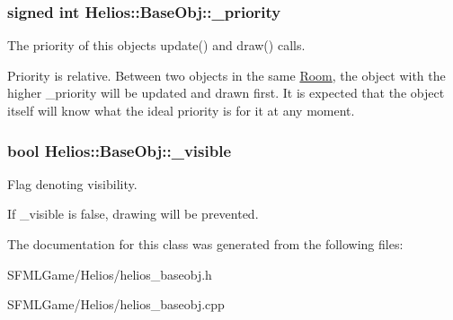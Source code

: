 \subsubsection[{\+\_\+priority}]{\setlength{\rightskip}{0pt plus 5cm}signed int Helios\+::\+Base\+Obj\+::\+\_\+priority\hspace{0.3cm}{\ttfamily [protected]}}\label{class_helios_1_1_base_obj_aad807d0a4296ffdfddf2e653b428481a}


The priority of this object\textquotesingle{}s update() and draw() calls. 

Priority is relative. Between two objects in the same \hyperlink{class_helios_1_1_room}{Room}, the object with the higher \+\_\+priority will be updated and drawn first. It is expected that the object itself will know what the ideal priority is for it at any moment. \hypertarget{class_helios_1_1_base_obj_aed78a9a68c038e6d82e07711f9065e33}{}
\subsubsection[{\+\_\+visible}]{\setlength{\rightskip}{0pt plus 5cm}bool Helios\+::\+Base\+Obj\+::\+\_\+visible\hspace{0.3cm}{\ttfamily [protected]}}\label{class_helios_1_1_base_obj_aed78a9a68c038e6d82e07711f9065e33}


Flag denoting visibility. 

If \+\_\+visible is false, drawing will be prevented. 

The documentation for this class was generated from the following files\+:\begin{DoxyCompactItemize}
\item 
S\+F\+M\+L\+Game/\+Helios/helios\+\_\+baseobj.\+h\item 
S\+F\+M\+L\+Game/\+Helios/helios\+\_\+baseobj.\+cpp\end{DoxyCompactItemize}
